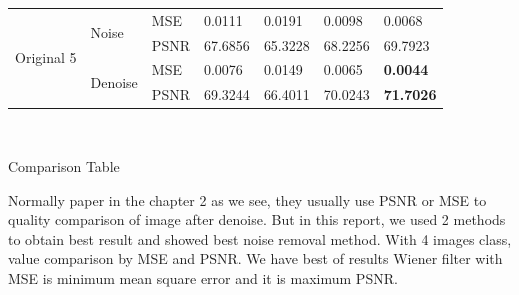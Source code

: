 \begin{center}
\begin{tabular}{llllllllllll|l|l|l|l|l|l|l|l|l|l|l|l|l|}
\multicolumn{4}{|l|}{\multirow{4}{*}{Original 5}} & \multicolumn{4}{l|}{\multirow{2}{*}{Noise}}   & \multicolumn{4}{l|}{MSE}  & \multicolumn{3}{l|}{0.0111}  & \multicolumn{3}{l|}{0.0191}  & \multicolumn{4}{l|}{0.0098}   & \multicolumn{3}{l|}{0.0068}           \\ \cline{9-25} 
\multicolumn{4}{|l|}{}                            & \multicolumn{4}{l|}{}                         & \multicolumn{4}{l|}{PSNR} & \multicolumn{3}{l|}{67.6856} & \multicolumn{3}{l|}{65.3228} & \multicolumn{4}{l|}{68.2256}  & \multicolumn{3}{l|}{69.7923}          \\ \cline{5-25} 
\multicolumn{4}{|l|}{}                            & \multicolumn{4}{l|}{\multirow{2}{*}{Denoise}} & \multicolumn{4}{l|}{MSE}  & \multicolumn{3}{l|}{0.0076}  & \multicolumn{3}{l|}{0.0149}  & \multicolumn{4}{l|}{0.0065}   & \multicolumn{3}{l|}{\textbf{0.0044}}  \\ \cline{9-25} 
\multicolumn{4}{|l|}{}                            & \multicolumn{4}{l|}{}                         & \multicolumn{4}{l|}{PSNR} & \multicolumn{3}{l|}{69.3244} & \multicolumn{3}{l|}{66.4011} & \multicolumn{4}{l|}{70.0243}  & \multicolumn{3}{l|}{\textbf{71.7026}} \\ \hline
\end{tabular}

\

Comparison Table
\end{center}









\vspace{1cm}

Normally paper in the chapter 2 as we see, they usually use PSNR or MSE to quality comparison of image after denoise. But in this report, we used 2 methods to obtain best result and showed best noise removal method. With 4 images class, value comparison by MSE and PSNR. We have best of results Wiener filter with MSE is minimum mean square error and it is maximum PSNR.
\newpage
